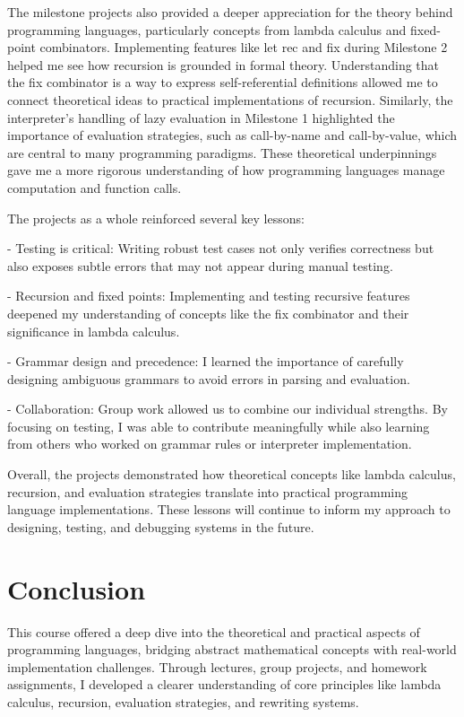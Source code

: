 \documentclass{article}
\theoremstyle{theorem}
\theoremstyle{definition}
\theoremstyle{remark}
\begin{document}
The milestone projects also provided a deeper appreciation for the theory behind programming languages, particularly concepts from lambda calculus and fixed-point combinators. Implementing features like let rec and fix during Milestone 2 helped me see how recursion is grounded in formal theory. Understanding that the fix combinator is a way to express self-referential definitions allowed me to connect theoretical ideas to practical implementations of recursion. Similarly, the interpreter's handling of lazy evaluation in Milestone 1 highlighted the importance of evaluation strategies, such as call-by-name and call-by-value, which are central to many programming paradigms. These theoretical underpinnings gave me a more rigorous understanding of how programming languages manage computation and function calls.

The projects as a whole reinforced several key lessons:

- Testing is critical: Writing robust test cases not only verifies correctness but also exposes subtle errors that may not appear during manual testing.

- Recursion and fixed points: Implementing and testing recursive features deepened my understanding of concepts like the fix combinator and their significance in lambda calculus.

- Grammar design and precedence: I learned the importance of carefully designing ambiguous grammars to avoid errors in parsing and evaluation.

- Collaboration: Group work allowed us to combine our individual strengths. By focusing on testing, I was able to contribute meaningfully while also learning from others who worked on grammar rules or interpreter implementation.

Overall, the projects demonstrated how theoretical concepts like lambda calculus, recursion, and evaluation strategies translate into practical programming language implementations. These lessons will continue to inform my approach to designing, testing, and debugging systems in the future.

\section{Conclusion}\label{conclusion}

This course offered a deep dive into the theoretical and practical aspects of programming languages, bridging abstract mathematical concepts with real-world implementation challenges. Through lectures, group projects, and homework assignments, I developed a clearer understanding of core principles like lambda calculus, recursion, evaluation strategies, and rewriting systems.
\end{document}
